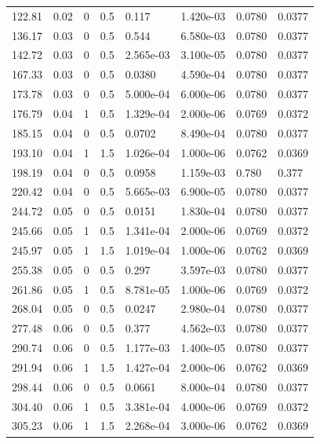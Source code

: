 \documentclass[preview]{standalone}
\begin{document}
{{\begin{tabular}{L{1.2cm}C{1.2cm} C{0.3cm}C{0.5cm} C{1.4cm}C{1.4cm} C{1.4cm}C{1.4cm}}
  122.81  &  0.02  & 0     & 0.5 &  0.117  & 1.420e-03  & 0.0780 &  0.0377   \\ 
  136.17  &  0.03  & 0     & 0.5 &  0.544  & 6.580e-03  & 0.0780 &  0.0377   \\ 
  142.72  &  0.03  & 0     & 0.5 &  2.565e-03  & 3.100e-05  & 0.0780 &  0.0377   \\ 
  167.33  &  0.03  & 0     & 0.5 &  0.0380  & 4.590e-04  & 0.0780 &  0.0377   \\ 
  173.78  &  0.03  & 0     & 0.5 &  5.000e-04  & 6.000e-06  & 0.0780 &  0.0377   \\ 
  176.79  &  0.04  & 1     & 0.5 &  1.329e-04  & 2.000e-06  & 0.0769 &  0.0372   \\ 
  185.15  &  0.04  & 0     & 0.5 &  0.0702  & 8.490e-04  & 0.0780 &  0.0377   \\ 
  193.10  &  0.04  & 1     & 1.5 &  1.026e-04  & 1.000e-06  & 0.0762 &  0.0369   \\ 
  198.19  &  0.04  & 0     & 0.5 &  0.0958  & 1.159e-03  & 0.780 &  0.377   \\ 
  220.42  &  0.04  & 0     & 0.5 &  5.665e-03  & 6.900e-05  & 0.0780 &  0.0377   \\ 
  244.72  &  0.05  & 0     & 0.5 &  0.0151  & 1.830e-04  & 0.0780 &  0.0377   \\ 
  245.66  &  0.05  & 1     & 0.5 &  1.341e-04  & 2.000e-06  & 0.0769 &  0.0372   \\ 
  245.97  &  0.05  & 1     & 1.5 &  1.019e-04  & 1.000e-06  & 0.0762 &  0.0369   \\ 
  255.38  &  0.05  & 0     & 0.5 &  0.297  & 3.597e-03  & 0.0780 &  0.0377   \\ 
  261.86  &  0.05  & 1     & 0.5 &  8.781e-05  & 1.000e-06  & 0.0769 &  0.0372   \\ 
  268.04  &  0.05  & 0     & 0.5 &  0.0247  & 2.980e-04  & 0.0780 &  0.0377   \\ 
  277.48  &  0.06  & 0     & 0.5 &  0.377  & 4.562e-03  & 0.0780 &  0.0377   \\ 
  290.74  &  0.06  & 0     & 0.5 &  1.177e-03  & 1.400e-05  & 0.0780 &  0.0377   \\ 
  291.94  &  0.06  & 1     & 1.5 &  1.427e-04  & 2.000e-06  & 0.0762 &  0.0369   \\ 
  298.44  &  0.06  & 0     & 0.5 &  0.0661  & 8.000e-04  & 0.0780 &  0.0377   \\ 
  304.40  &  0.06  & 1     & 0.5 &  3.381e-04  & 4.000e-06  & 0.0769 &  0.0372   \\ 
  305.23  &  0.06  & 1     & 1.5 &  2.268e-04  & 3.000e-06  & 0.0762 &  0.0369   \\ 

\end{tabular}}}
\end{document}
